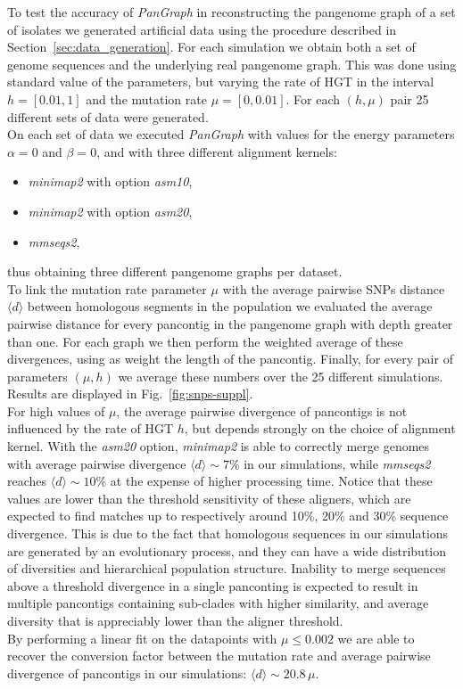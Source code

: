 \documentclass[aps,rmp,reprint,superscriptaddress,notitlepage,10pt,onecolumn]{revtex4-1}
\newcommand{\avg}[1]{\langle #1 \rangle}
\begin{document}
To test the accuracy of \textit{PanGraph} in reconstructing the pangenome graph of a set of isolates we generated artificial data using the procedure described in Section~\ref{sec:data_generation}. For each simulation we obtain both a set of genome sequences and the underlying real pangenome graph. This was done using standard value of the parameters, but varying the rate of HGT in the interval $h=[0.01,1]$ and the mutation rate $\mu=[0,0.01]$. For each $(h,\mu)$ pair 25 different sets of data were generated.\\
On each set of data we executed \textit{PanGraph} with values for the energy parameters $\alpha=0$ and $\beta=0$, and with three different alignment kernels:
\begin{itemize}
    \itemsep0pt
    \item \textit{minimap2} with option \textit{asm10},
    \item \textit{minimap2} with option \textit{asm20},
    \item \textit{mmseqs2},
\end{itemize}
thus obtaining three different pangenome graphs per dataset.\\
To link the mutation rate parameter $\mu$ with the average pairwise SNPs distance $\avg{d}$ between homologous segments in the population we evaluated the average pairwise distance for every pancontig in the pangenome graph with depth greater than one. For each graph we then perform the weighted average of these divergences, using as weight the length of the pancontig. Finally, for every pair of parameters $(\mu,h)$ we average these numbers over the 25 different simulations. Results are displayed in Fig.~\ref{fig:snps-suppl}.\\
For high values of $\mu$, the average pairwise divergence of pancontigs is not influenced by the rate of HGT $h$, but depends strongly on the choice of alignment kernel. With the \textit{asm20} option, \textit{minimap2} is able to correctly merge genomes with average pairwise divergence $\avg{d} \sim 7\%$ in our simulations, while \textit{mmseqs2} reaches $\avg{d} \sim 10\%$ at the expense of higher processing time. Notice that these values are lower than the threshold sensitivity of these aligners, which are expected to find matches up to respectively around 10\%, 20\% and 30\% sequence divergence. This is due to the fact that homologous sequences in our simulations are generated by an evolutionary process, and they can have a wide distribution of diversities and hierarchical population structure. Inability to merge sequences above a threshold divergence in a single panconting is expected to result in multiple pancontigs containing sub-clades with higher similarity, and average diversity that is appreciably lower than the aligner threshold.\\
By performing a linear fit on the datapoints with $\mu \leq 0.002$ we are able to recover the conversion factor between the mutation rate and average pairwise divergence of pancontigs in our simulations: $\avg{d} \sim 20.8 \, \mu$.
\end{document}
